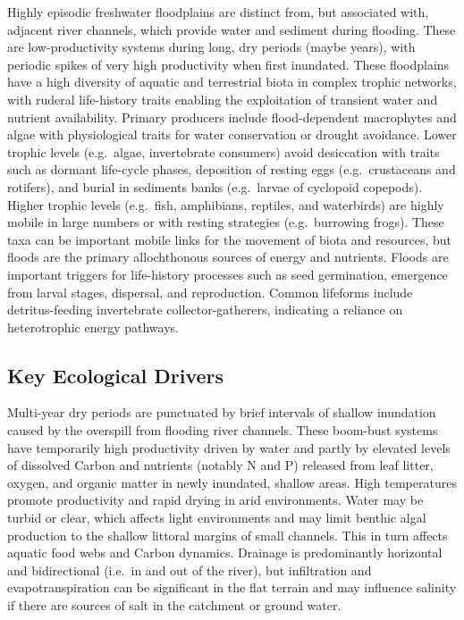 \documentclass[
  letterpaper,
  DIV=11,
  numbers=noendperiod]{scrartcl}
\begin{document}
Highly episodic freshwater floodplains are distinct from, but associated
with, adjacent river channels, which provide water and sediment during
flooding. These are low-productivity systems during long, dry periods
(maybe years), with periodic spikes of very high productivity when first
inundated. These floodplains have a high diversity of aquatic and
terrestrial biota in complex trophic networks, with ruderal life-history
traits enabling the exploitation of transient water and nutrient
availability. Primary producers include flood-dependent macrophytes and
algae with physiological traits for water conservation or drought
avoidance. Lower trophic levels (e.g.~algae, invertebrate consumers)
avoid desiccation with traits such as dormant life-cycle phases,
deposition of resting eggs (e.g.~crustaceans and rotifers), and burial
in sediments banks (e.g.~larvae of cyclopoid copepods). Higher trophic
levels (e.g.~fish, amphibians, reptiles, and waterbirds) are highly
mobile in large numbers or with resting strategies (e.g.~burrowing
frogs). These taxa can be important mobile links for the movement of
biota and resources, but floods are the primary allochthonous sources of
energy and nutrients. Floods are important triggers for life-history
processes such as seed germination, emergence from larval stages,
dispersal, and reproduction. Common lifeforms include detritus-feeding
invertebrate collector-gatherers, indicating a reliance on heterotrophic
energy pathways.

\subsection{Key Ecological Drivers}\label{key-ecological-drivers-107}

Multi-year dry periods are punctuated by brief intervals of shallow
inundation caused by the overspill from flooding river channels. These
boom-bust systems have temporarily high productivity driven by water and
partly by elevated levels of dissolved Carbon and nutrients (notably N
and P) released from leaf litter, oxygen, and organic matter in newly
inundated, shallow areas. High temperatures promote productivity and
rapid drying in arid environments. Water may be turbid or clear, which
affects light environments and may limit benthic algal production to the
shallow littoral margins of small channels. This in turn affects aquatic
food webs and Carbon dynamics. Drainage is predominantly horizontal and
bidirectional (i.e.~in and out of the river), but infiltration and
evapotranspiration can be significant in the flat terrain and may
influence salinity if there are sources of salt in the catchment or
ground water.
\end{document}

